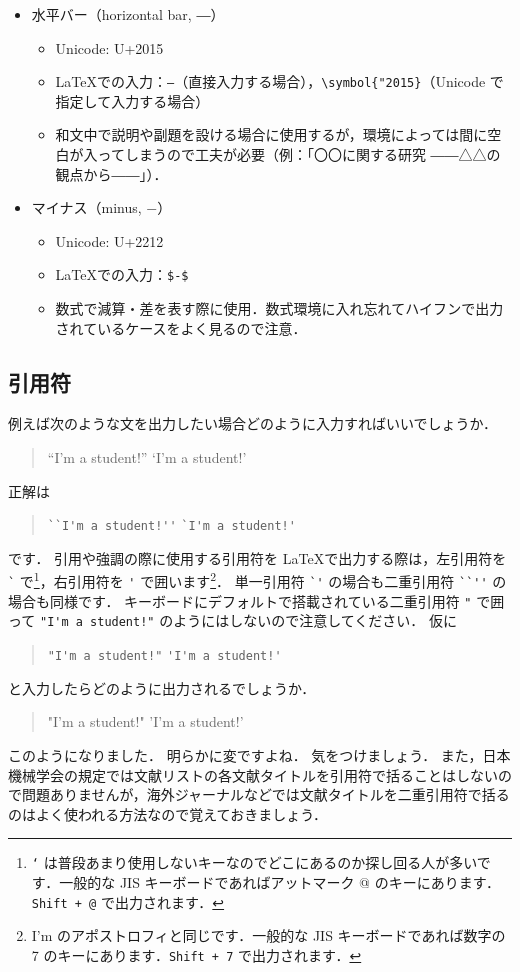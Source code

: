 \begin{itemize}
\begin{itemize}
    \end{itemize}
    \item 水平バー（horizontal bar, ―）
    \begin{itemize}
        \item Unicode: U+2015
        \item \LaTeX での入力：\verb|―|（直接入力する場合），\verb|\symbol{"2015}|（Unicode で指定して入力する場合）
        \item 和文中で説明や副題を設ける場合に使用するが，環境によっては間に空白が入ってしまうので工夫が必要（例：「〇〇に関する研究 ――△△の観点から――」）．
    \end{itemize}
    \item マイナス（minus, $-$）
    \begin{itemize}
        \item Unicode: U+2212
        \item \LaTeX での入力：\verb|$-$|
        \item 数式で減算・差を表す際に使用．数式環境に入れ忘れてハイフンで出力されているケースをよく見るので注意．
    \end{itemize}
\end{itemize}

\subsection*{引用符}
\label{ssec:quotation}

例えば次のような文を出力したい場合どのように入力すればいいでしょうか．
\begin{quotation}
    ``I'm a student!'' \qquad `I'm a student!'
\end{quotation}
正解は
\begin{quotation}
    \verb|``I'm a student!''| \qquad \verb|`I'm a student!'|
\end{quotation}
です．
引用や強調の際に使用する引用符を \LaTeX で出力する際は，左引用符を \verb|`| で\footnote{\texttt{`} は普段あまり使用しないキーなのでどこにあるのか探し回る人が多いです．一般的な JIS キーボードであればアットマーク @ のキーにあります．\texttt{Shift + @} で出力されます．}，右引用符を \verb|'| で囲います\footnote{I'm のアポストロフィと同じです．一般的な JIS キーボードであれば数字の 7 のキーにあります．\texttt{Shift + 7} で出力されます．}．
単一引用符 \verb|`'| の場合も二重引用符 \verb|``''| の場合も同様です．
キーボードにデフォルトで搭載されている二重引用符 \verb|"| で囲って \verb|"I'm a student!"| のようにはしないので注意してください．
仮に
\begin{quotation}
    \verb|"I'm a student!"| \qquad \verb|'I'm a student!'|
\end{quotation}
と入力したらどのように出力されるでしょうか．
\begin{quotation}
    "I'm a student!" \qquad 'I'm a student!'
\end{quotation}
このようになりました．
明らかに変ですよね．
気をつけましょう．
また，日本機械学会の規定では文献リストの各文献タイトルを引用符で括ることはしないので問題ありませんが，海外ジャーナルなどでは文献タイトルを二重引用符で括るのはよく使われる方法なので覚えておきましょう．

